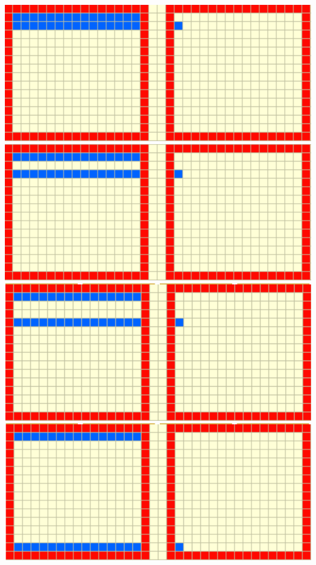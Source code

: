 \documentclass[12]{article}
\begin{document}
\begin{center}
\includegraphics[scale=0.30]{figures/lu1a}\hspace{1em}
\includegraphics[scale=0.30]{figures/lu1b}
\hspace{1em}
\includegraphics[scale=0.30]{figures/lu1c}
\hspace{1em}
\includegraphics[scale=0.30]{figures/lu2} 



\end{center}
\end{document}
